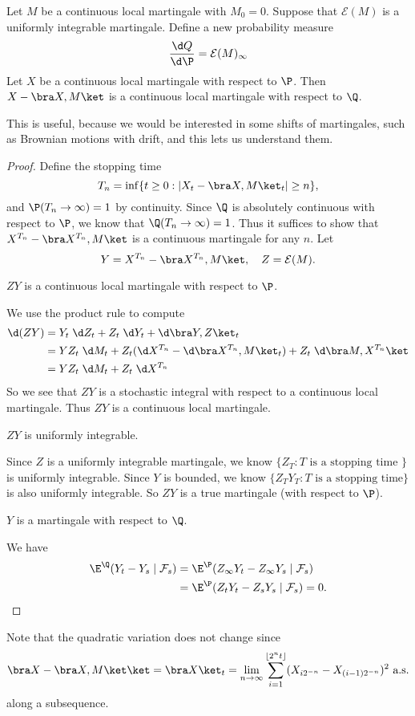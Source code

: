 \documentclass[a4paper]{article}
\begin{document}
\begin{thm}
  Let $M$ be a continuous local martingale with $M_0 = 0$. Suppose that $\mathcal{E}(M)$ is a uniformly integrable martingale. Define a new probability measure
  \[
    \frac{\d Q}{\d \P} = \mathcal{E}(M)_\infty
  \]
  Let $X$ be a continuous local martingale with respect to $\P$. Then $X - \bra X, M\ket$ is a continuous local martingale with respect to $\Q$.
\end{thm}
This is useful, because we would be interested in some shifts of martingales, such as Brownian motions with drift, and this lets us understand them.

\begin{proof}
  Define the stopping time
  \[
    T_n = \inf\{ t \geq 0: |X_t - \bra X, M\ket_t| \geq n\},
  \]
  and $\P(T_n \to \infty) = 1$ by continuity. Since $\Q$ is absolutely continuous with respect to $\P$, we know that $\Q(T_n \to \infty) = 1$. Thus it suffices to show that $X^{T_n} - \bra X^{T_n}, M\ket$ is a continuous martingale for any $n$. Let
  \[
    Y = X^{T_n} - \bra X^{T_n}, M\ket,\quad Z = \mathcal{E}(M).
  \]
  \begin{claim}
    $ZY$ is a continuous local martingale with respect to $\P$.
  \end{claim}
  We use the product rule to compute
  \begin{align*}
    \d (ZY) &= Y_t \;\d Z_t + Z_t \;\d Y_t + \d \bra Y, Z\ket_t\\
    &= Y Z_t \;\d M_t + Z_t (\d X^{T_n} - \d \bra X^{T_n}, M\ket_t) + Z_t \;\d \bra M, X^{T_n}\ket\\
    &= Y Z_t \;\d M_t + Z_t\;\d X^{T_n}
  \end{align*}
  So we see that $ZY$ is a stochastic integral with respect to a continuous local martingale. Thus $ZY$ is a continuous local martingale.

  \begin{claim}
    $ZY$ is uniformly integrable.
  \end{claim}
  Since $Z$ is a uniformly integrable martingale, we know $\{Z_T: T\text{ is a stopping time }\}$ is uniformly integrable. Since $Y$ is bounded, we know $\{Z_T Y_T: T\text{ is a stopping time}\}$ is also uniformly integrable. So $ZY$ is a true martingale (with respect to $\P$).

  \begin{claim}
    $Y$ is a martingale with respect to $\Q$.
  \end{claim}
  We have
  \begin{align*}
    \E^{\Q}(Y_t - Y_s \mid \mathcal{F}_s) &= \E^\P(Z_\infty Y_t - Z_\infty Y_s \mid \mathcal{F}_s)\\
    &= \E^{\P} (Z_t Y_t - Z_s Y_s \mid \mathcal{F}_s) = 0.\qedhere
  \end{align*}
\end{proof}
Note that the quadratic variation does not change since
\[
  \bra X - \bra X, M\ket \ket = \bra X \ket_t = \lim_{n \to \infty} \sum_{i = 1}^{\lfloor 2^n t \rfloor} (X_{i 2^{-n}} - X_{(i - 1)2^{-n}})^2\text{ a.s.}
\]
along a subsequence.
\end{document}
